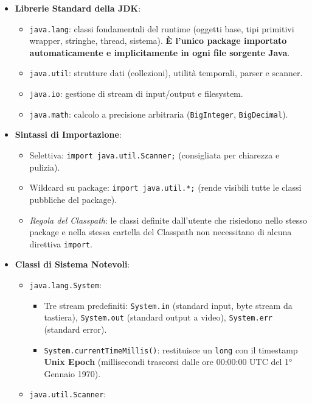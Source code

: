 \documentclass[11pt,a4paper,oneside]{report}
\newcommand{\passthrough}[1]{#1}
\providecommand{\tightlist}{\setlength{\itemsep}{0pt}\setlength{\parskip}{0pt}}
\begin{document}
\begin{itemize}
\tightlist
\item
  \textbf{Librerie Standard della JDK}:

  \begin{itemize}
  \tightlist
  \item
    \passthrough{\lstinline!java.lang!}: classi fondamentali del runtime
    (oggetti base, tipi primitivi wrapper, stringhe, thread, sistema).
    \textbf{È l'unico package importato automaticamente e implicitamente
    in ogni file sorgente Java}.
  \item
    \passthrough{\lstinline!java.util!}: strutture dati (collezioni),
    utilità temporali, parser e scanner.
  \item
    \passthrough{\lstinline!java.io!}: gestione di stream di
    input/output e filesystem.
  \item
    \passthrough{\lstinline!java.math!}: calcolo a precisione arbitraria
    (\passthrough{\lstinline!BigInteger!},
    \passthrough{\lstinline!BigDecimal!}).
  \end{itemize}
\item
  \textbf{Sintassi di Importazione}:

  \begin{itemize}
  \tightlist
  \item
    Selettiva: \passthrough{\lstinline!import java.util.Scanner;!}
    (consigliata per chiarezza e pulizia).
  \item
    Wildcard su package: \passthrough{\lstinline!import java.util.*;!}
    (rende visibili tutte le classi pubbliche del package).
  \item
    \emph{Regola del Classpath}: le classi definite dall'utente che
    risiedono nello stesso package e nella stessa cartella del Classpath
    non necessitano di alcuna direttiva
    \passthrough{\lstinline!import!}.
  \end{itemize}
\item
  \textbf{Classi di Sistema Notevoli}:

  \begin{itemize}
  \tightlist
  \item
    \passthrough{\lstinline!java.lang.System!}:

    \begin{itemize}
    \tightlist
    \item
      Tre stream predefiniti: \passthrough{\lstinline!System.in!}
      (standard input, byte stream da tastiera),
      \passthrough{\lstinline!System.out!} (standard output a video),
      \passthrough{\lstinline!System.err!} (standard error).
    \item
      \passthrough{\lstinline!System.currentTimeMillis()!}: restituisce
      un \passthrough{\lstinline!long!} con il timestamp \textbf{Unix
      Epoch} (millisecondi trascorsi dalle ore 00:00:00 UTC del 1°
      Gennaio 1970).
    \end{itemize}
  \item
    \passthrough{\lstinline!java.util.Scanner!}:


\end{itemize}
\end{itemize}
\end{document}
